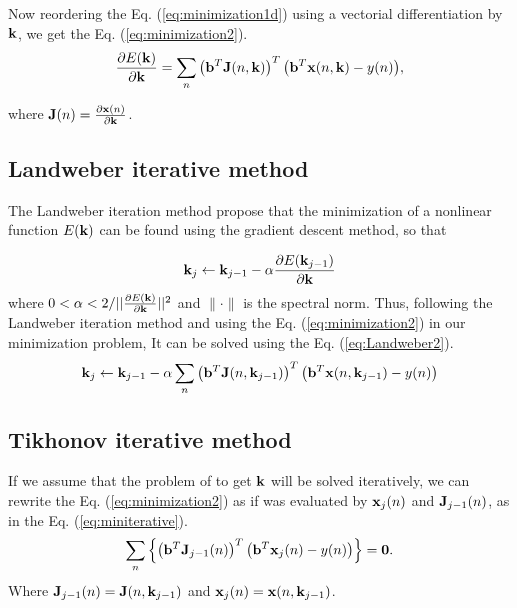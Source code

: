 \documentclass[11pt,twoside,a4paper]{article}
\newcommand{\MATRIX}[1]{\mathbf{\uppercase{#1}}}
\newcommand{\VECTOR}[1]{\mathbf{\lowercase{#1}}}
\begin{document}
Now reordering the Eq. 
(\ref{eq:minimization1d}) using a vectorial differentiation by $\VECTOR{k}$, we get the 
Eq. (\ref{eq:minimization2}).
\begin{equation}\label{eq:minimization2}
 \frac{\partial E(\VECTOR{k})}{\partial \VECTOR{k}}=\sum_{n}{ \left( \VECTOR{b}^{T}\MATRIX{J}(n,\VECTOR{k})\right)^{T} \left(\VECTOR{b}^{T}\VECTOR{X}(n,\VECTOR{k}) -y(n) \right) },
\end{equation}

where $\MATRIX{J}(n)=\frac{\partial \VECTOR{X}(n)}{\partial \VECTOR{k}}$.

\subsection{Landweber iterative method}
The Landweber iteration method propose that 
the minimization of a nonlinear function $E(\VECTOR{k})$ can be found using
the gradient descent method, so that 

\begin{equation}\label{eq:Landweber1}
\VECTOR{k}_{j}\leftarrow \VECTOR{k}_{j-1} - \alpha \frac{\partial E(\VECTOR{k}_{j-1})}{\partial \VECTOR{k}}
\end{equation}
where $0 < \alpha < 2/||\frac{\partial E(\VECTOR{k})}{\partial \VECTOR{k}}||^2$ and
$\|\cdot \|$ is the spectral norm. Thus, following the Landweber iteration method
and using the Eq. (\ref{eq:minimization2}) in
our minimization problem, It can be solved using the Eq. (\ref{eq:Landweber2}).
\begin{equation}\label{eq:Landweber2}
\VECTOR{k}_{j}\leftarrow \VECTOR{k}_{j-1} 
- \alpha \sum_{n}{ \left( \VECTOR{b}^{T}\MATRIX{J}(n,\VECTOR{k}_{j-1})\right)^{T} \left(\VECTOR{b}^{T}\VECTOR{X}(n,\VECTOR{k}_{j-1}) -y(n) \right) }
\end{equation}
\subsection{Tikhonov iterative method}

If we assume that the problem of to get $\VECTOR{k}$ will be solved iteratively, 
we can  rewrite the Eq. (\ref{eq:minimization2}) as if was evaluated by $\VECTOR{X}_{j}(n)$
and $\MATRIX{J}_{j-1}(n)$, as in the Eq. (\ref{eq:miniterative}).
\begin{equation}\label{eq:miniterative}
\sum_{n}{\left\{ \left( \VECTOR{b}^{T}\MATRIX{J}_{j-1}(n)\right)^{T} \left(\VECTOR{b}^{T}\VECTOR{X}_{j}(n) - y(n)  \right) \right \}}=\mathbf{0}.
\end{equation}
Where $\MATRIX{J}_{j-1}(n)=\MATRIX{J}(n,\VECTOR{k}_{j-1})$ and
$\VECTOR{X}_{j}(n)=\VECTOR{X}(n,\VECTOR{k}_{j-1})$.
\end{document}
